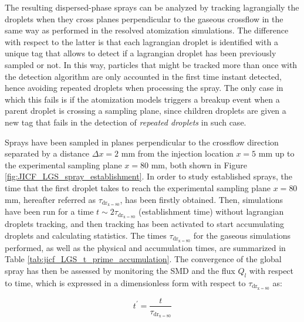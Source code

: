 The resulting dispersed-phase sprays can be analyzed by tracking lagrangially the droplets when they cross planes perpendicular to the gaseous crossflow in the same way as performed in the resolved atomization simulations. The difference with respect to the latter is that each lagrangian droplet is identified with a unique tag that allows to detect if a lagrangian droplet has been previously sampled or not.  In this way, particles that might be tracked more than once with the detection algorithm are only accounted in the first time instant detected, hence avoiding repeated droplets when processing the spray. The only case in which this fails is if the atomization models triggers a breakup event when a parent droplet is crossing a sampling plane, since children droplets are given a new tag that fails in the detection of \textsl{repeated droplets} in such case.

Sprays have been sampled in planes perpendicular to the crossflow direction separated by a distance $\Delta x = 2$ mm from the injection location $x = 5$ mm up to the experimental sampling plane $x = 80$ mm, both shown in Figure \ref{fig:JICF_LGS_spray_establishment}. In order to study established sprays, the time that the first droplet takes to reach the experimental sampling plane $x = 80$ mm, hereafter referred as $\tau_\mathrm{dr_{x=80}}$, has been firstly obtained. Then, simulations have been run for a time $t \sim 2 \tau_\mathrm{dr_{x=80}}$ (establishment time) without lagrangian droplets tracking, and then tracking has been activated to start accumulating droplets and calculating statistics. The times $\tau_\mathrm{dr_{x=80}}$ for the gaseous simulations performed, as well as the physical and accumulation times, are summarized in Table \ref{tab:jicf_LGS_t_prime_accumulation}. The convergence of the global spray has then be assessed by monitoring the SMD and the flux $Q_l$ with respect to time, which is expressed in a dimensionless form with respect to $\tau_\mathrm{dr_{x=80}}$ as:

\begin{equation}
\label{eq:t_prime_with_tau_drx80}
t^{\prime} = \frac{t}{\tau_\mathrm{dr_{x=80}}}
\end{equation}



